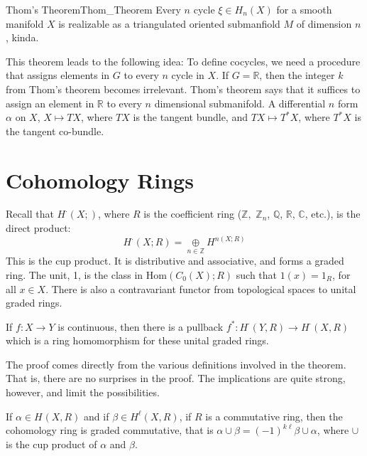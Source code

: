     \begin{ltheorem}{Thom's Theorem}{Thom_Theorem}
        Every $n$ cycle $\xi\in{H}_{n}(X)$ for a
        smooth manifold $X$ is realizable as a
        triangulated oriented submanfiold $M$ of
        dimension $n$, kinda.
    \end{ltheorem}
    This theorem leads to the following idea:
    To define cocycles, we need a procedure that
    assigns elements in $G$ to every $n$ cycle in
    $X$. If $G=\mathbb{R}$, then the integer $k$ from
    Thom's theorem becomes irrelevant. Thom's theorem
    says that it suffices to assign an element in
    $\mathbb{R}$ to every $n$ dimensional submanifold.
    A differential $n$ form $\alpha$ on $X$,
    $X\mapsto{TX}$, where $TX$ is the tangent bundle,
    and $TX\mapsto{T^{*}}X$, where $T^{*}X$ is the
    tangent co-bundle. 
\section{Cohomology Rings}
    Recall that $H^{\cdot}(X;)$, where $R$ is the coefficient
    ring ($\mathbb{Z},$ $\mathbb{Z}_{n}$, $\mathbb{Q}$,
    $\mathbb{R}$, $\mathbb{C}$, etc.), is the direct product:
    \begin{equation}
        H^{\cdot}(X;R)=\underset{n\in\mathbb{Z}}{\oplus}
            H^{n(X;R)}
    \end{equation}
    This is the cup product. It is distributive and associative,
    and forms a graded ring. The unit, 1, is the class
    in $\mathrm{Hom}(C_{0}(X);R)$ such that $1(x)=1_{R}$, for
    all $x\in{X}$. There is also a contravariant functor
    from topological spaces to unital graded rings.
    \begin{theorem}
        If $f:X\rightarrow{Y}$ is continuous, then there is a
        pullback
        $f^{*}:H^{\cdot}(Y,R)\rightarrow{H}^{\cdot}(X,R)$
        which is a ring homomorphism for these unital graded
        rings.
    \end{theorem}
    The proof comes directly from the various definitions
    involved in the theorem. That is, there are no surprises in
    the proof. The implications are quite strong, however, and
    limit the possibilities.
    \begin{theorem}
        If $\alpha\in{H}^{}(X,R)$ and if
        $\beta\in{H}^{\ell}(X,R)$, if $R$ is a commutative ring,
        then the cohomology ring is graded commutative, that is
        $\alpha\cup\beta=(\minus{1})^{k\ell}\beta\cup\alpha$,
        where $\cup$ is the cup product of $\alpha$ and $\beta$.
    \end{theorem}
